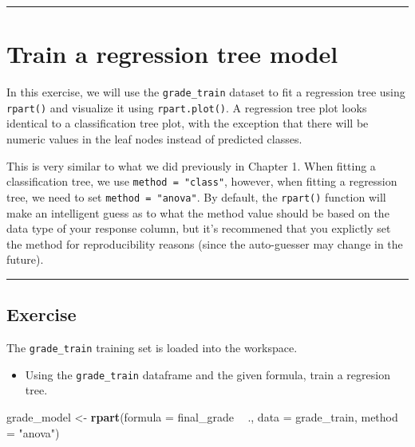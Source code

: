 \documentclass[
]{book}
\newenvironment{Shaded}{\begin{snugshade}}{\end{snugshade}}
\newcommand{\DataTypeTok}[1]{\textcolor[rgb]{0.13,0.29,0.53}{#1}}
\newcommand{\KeywordTok}[1]{\textcolor[rgb]{0.13,0.29,0.53}{\textbf{#1}}}
\newcommand{\NormalTok}[1]{#1}
\newcommand{\OperatorTok}[1]{\textcolor[rgb]{0.81,0.36,0.00}{\textbf{#1}}}
\newcommand{\StringTok}[1]{\textcolor[rgb]{0.31,0.60,0.02}{#1}}
\providecommand{\tightlist}{%
  \setlength{\itemsep}{0pt}\setlength{\parskip}{0pt}}
\begin{document}
\begin{center}\rule{0.5\linewidth}{0.5pt}\end{center}

\hypertarget{train-a-regression-tree-model}{%
\section{Train a regression tree model}\label{train-a-regression-tree-model}}

In this exercise, we will use the \texttt{grade\_train} dataset to fit a regression tree using \texttt{rpart()} and visualize it using \texttt{rpart.plot()}. A regression tree plot looks identical to a classification tree plot, with the exception that there will be numeric values in the leaf nodes instead of predicted classes.

This is very similar to what we did previously in Chapter 1. When fitting a classification tree, we use \texttt{method\ =\ "class"}, however, when fitting a regression tree, we need to set \texttt{method\ =\ "anova"}. By default, the \texttt{rpart()} function will make an intelligent guess as to what the method value should be based on the data type of your response column, but it's recommened that you explictly set the method for reproducibility reasons (since the auto-guesser may change in the future).

\begin{center}\rule{0.5\linewidth}{0.5pt}\end{center}

\hypertarget{exercise-5}{%
\subsection*{Exercise}\label{exercise-5}}

The \texttt{grade\_train} training set is loaded into the workspace.

\begin{itemize}
\tightlist
\item
  Using the \texttt{grade\_train} dataframe and the given formula, train a regresion tree.
\end{itemize}

\begin{Shaded}
\begin{Highlighting}[]
\NormalTok{grade_model <-}\StringTok{ }\KeywordTok{rpart}\NormalTok{(}\DataTypeTok{formula =}\NormalTok{ final_grade }\OperatorTok{~}\StringTok{ }\NormalTok{., }
                     \DataTypeTok{data =}\NormalTok{ grade_train, }
                     \DataTypeTok{method =} \StringTok{"anova"}\NormalTok{)}
\end{Highlighting}
\end{Shaded}
\end{document}
